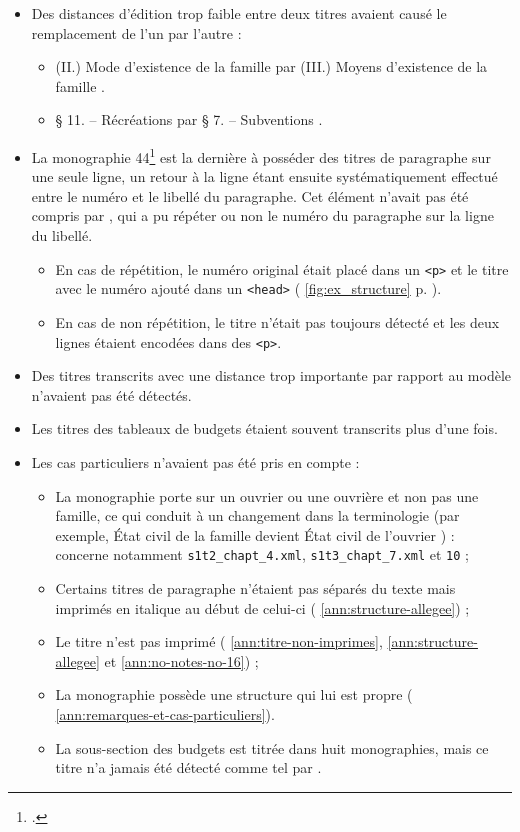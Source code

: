 \begin{itemize}
    \item Des distances d'édition trop faible entre deux titres avaient causé le remplacement de l'un par l'autre :
    \begin{itemize}
        \item (II.) \og Mode d'existence de la famille \fg{} par (III.) \og Moyens d'existence de la famille \fg.
        \item \og § 11. -- Récréations \fg{} par \og § 7. -- Subventions \fg.
    \end{itemize}
    \item La monographie \no{} 44\footcite{mono044a} est la dernière à posséder des titres de paragraphe sur une seule ligne, un retour à la ligne étant ensuite systématiquement effectué entre le numéro et le libellé du paragraphe. Cet élément n'avait pas été compris par \lse, qui a pu répéter ou non le numéro du paragraphe sur la ligne du libellé.
    \begin{itemize}
        \item En cas de répétition, le numéro original était placé dans un \texttt{<p>} et le titre avec le numéro ajouté dans un \texttt{<head>} (\fig{} \ref{fig:ex_structure} p. \pageref{fig:ex_structure}).
        \item En cas de non répétition, le titre n'était pas toujours détecté et les deux lignes étaient encodées dans des \texttt{<p>}.
    \end{itemize}
    \item Des titres transcrits avec une distance trop importante par rapport au modèle n'avaient pas été détectés.
    \item Les titres des tableaux de budgets étaient souvent transcrits plus d'une fois.
    \item Les cas particuliers n'avaient pas été pris en compte :
    \begin{itemize}
        \item La monographie porte sur un ouvrier ou une ouvrière et non pas une famille, ce qui conduit à un changement dans la terminologie (par exemple, \og État civil de la famille \fg{} devient \og État civil de l'ouvrier \fg) : concerne notamment \texttt{s1t2\_chapt\_4.xml}, \texttt{s1t3\_chapt\_7.xml} et \texttt{10} ;
        \item Certains titres de paragraphe n'étaient pas séparés du texte mais imprimés en italique au début de celui-ci (\ann{} \ref{ann:structure-allegee}) ;
        \item Le titre n'est pas imprimé (\ann{} \ref{ann:titre-non-imprimes}, \ref{ann:structure-allegee} et \ref{ann:no-notes-no-16}) ;
        \item La monographie possède une structure qui lui est propre (\ann{} \ref{ann:remarques-et-cas-particuliers}).
        \item La sous-section des budgets est titrée dans huit monographies, mais ce titre n'a jamais été détecté comme tel par \lse.
    \end{itemize}
\end{itemize}


